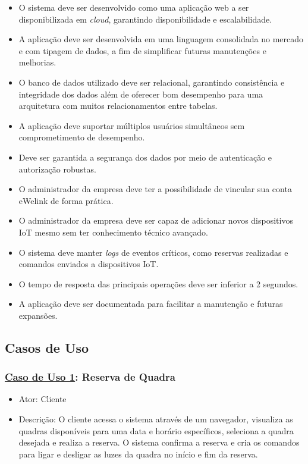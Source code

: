 \begin{itemize}
     \item O sistema deve ser desenvolvido como uma aplicação web a ser disponibilizada em \textit{cloud}, garantindo disponibilidade e escalabilidade.
     \item A aplicação deve ser desenvolvida em uma linguagem consolidada no mercado e com tipagem de dados, a fim de simplificar futuras manutenções e melhorias.
     \item O banco de dados utilizado deve ser relacional, garantindo consistência e integridade dos dados além de oferecer bom desempenho para uma arquitetura com muitos relacionamentos entre tabelas.
     \item A aplicação deve suportar múltiplos usuários simultâneos sem comprometimento de desempenho.
     \item Deve ser garantida a segurança dos dados por meio de autenticação e autorização robustas.
     \item O administrador da empresa deve ter a possibilidade de vincular sua conta eWelink de forma prática.
     \item O administrador da empresa deve ser capaz de adicionar novos dispositivos IoT mesmo sem ter conhecimento técnico avançado.
     \item O sistema deve manter \textit{logs} de eventos críticos, como reservas realizadas e comandos enviados a dispositivos IoT.
     \item O tempo de resposta das principais operações deve ser inferior a 2 segundos.
     \item A aplicação deve ser documentada para facilitar a manutenção e futuras expansões.
\end{itemize}


\subsection{Casos de Uso}\label{subsec:casos_de_uso}

\subsubsection*{\underline{Caso de Uso 1}: Reserva de Quadra}
\begin{itemize}
     \item Ator: Cliente
     \item Descrição: O cliente acessa o sistema através de um navegador, visualiza as quadras disponíveis para uma data e horário específicos, seleciona a quadra desejada e realiza a reserva. O sistema confirma a reserva e cria os comandos para ligar e desligar as luzes da quadra no início e fim da reserva.
\end{itemize}

